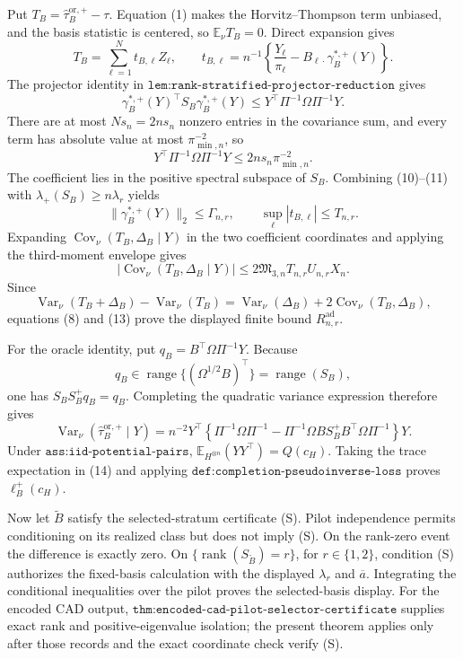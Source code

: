 Put \(T_B=\widehat\tau_B^{\mathrm{or},+}-\tau\).  Equation (1) makes the Horvitz--Thompson term unbiased, and the basis statistic is centered, so \(\mathbb E_\nu T_B=0\).  Direct expansion gives
\[
T_B=\sum_{\ell=1}^{N}t_{B,\ell}Z_\ell,
\qquad
t_{B,\ell}=n^{-1}\left\{\frac{Y_\ell}{\pi_\ell}
-B_{\ell\cdot}\gamma_B^{*,+}(Y)\right\}.
\tag{9}
\]
The projector identity in \(\texttt{lem:rank-stratified-projector-reduction}\) gives
\[
\gamma_B^{*,+}(Y)^\top S_B\gamma_B^{*,+}(Y)
\le Y^\top\Pi^{-1}\Omega\Pi^{-1}Y.
\tag{10}
\]
There are at most \(Ns_n=2ns_n\) nonzero entries in the covariance sum, and every term has absolute value at most \(\pi_{\min,n}^{-2}\), so
\[
Y^\top\Pi^{-1}\Omega\Pi^{-1}Y
\le2ns_n\pi_{\min,n}^{-2}.
\tag{11}
\]
The coefficient lies in the positive spectral subspace of \(S_B\).  Combining (10)--(11) with \(\lambda_+(S_B)\ge n\lambda_r\) yields
\[
\lVert\gamma_B^{*,+}(Y)\rVert_2\le\Gamma_{n,r},
\qquad
\sup_\ell|t_{B,\ell}|\le T_{n,r}.
\tag{12}
\]
Expanding \(\operatorname{Cov}_\nu(T_B,\Delta_B\mid Y)\) in the two coefficient coordinates and applying the third-moment envelope gives
\[
|\operatorname{Cov}_\nu(T_B,\Delta_B\mid Y)|
\le2\mathfrak M_{3,n}T_{n,r}U_{n,r}X_n.
\tag{13}
\]
Since
\[
\operatorname{Var}_\nu(T_B+\Delta_B)-\operatorname{Var}_\nu(T_B)
=\operatorname{Var}_\nu(\Delta_B)+2\operatorname{Cov}_\nu(T_B,\Delta_B),
\]
equations (8) and (13) prove the displayed finite bound \(R_{n,r}^{\mathrm{ad}}\).

For the oracle identity, put \(q_B=B^\top\Omega\Pi^{-1}Y\).  Because
\[
q_B\in\operatorname{range}\{(\Omega^{1/2}B)^\top\}
=\operatorname{range}(S_B),
\]
one has \(S_BS_B^+q_B=q_B\).  Completing the quadratic variance expression therefore gives
\[
\operatorname{Var}_\nu(\widehat\tau_B^{\mathrm{or},+}\mid Y)
=n^{-2}Y^\top\left\{\Pi^{-1}\Omega\Pi^{-1}
-\Pi^{-1}\Omega BS_B^+B^\top\Omega\Pi^{-1}\right\}Y.
\tag{14}
\]
Under \(\texttt{ass:iid-potential-pairs}\), \(\mathbb E_{H^{\otimes n}}(YY^\top)=Q(c_H)\).  Taking the trace expectation in (14) and applying \(\texttt{def:completion-pseudoinverse-loss}\) proves \(\ell_B^+(c_H)\).

Now let \(\widetilde B\) satisfy the selected-stratum certificate (S).  Pilot independence permits conditioning on its realized class but does not imply (S).  On the rank-zero event the difference is exactly zero.  On \(\{\operatorname{rank}(S_{\widetilde B})=r\}\), for \(r\in\{1,2\}\), condition (S) authorizes the fixed-basis calculation with the displayed \(\lambda_r\) and \(\overline a\).  Integrating the conditional inequalities over the pilot proves the selected-basis display.  For the encoded CAD output, \(\texttt{thm:encoded-cad-pilot-selector-certificate}\) supplies exact rank and positive-eigenvalue isolation; the present theorem applies only after those records and the exact coordinate check verify (S).

